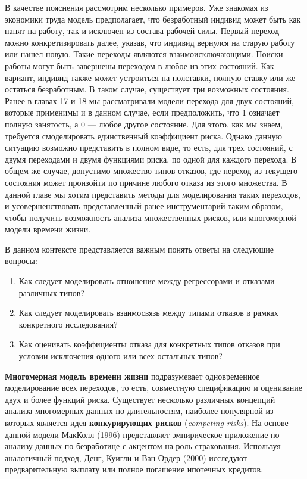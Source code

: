 В качестве пояснения рассмотрим несколько примеров. Уже знакомая из экономики труда модель предполагает, что безработный индивид может быть как нанят на работу, так и исключен из состава рабочей силы. Первый переход можно конкретизировать далее, указав, что индивид вернулся на старую работу или нашел новую. Такие переходы являются взаимоисключающими. Поиски работы могут быть завершены переходом в любое из этих состояний. Как вариант, индивид также может устроиться на полставки, полную ставку или же остаться безработным. В таком случае, существует три возможных состояния. Ранее в главах 17 и 18 мы рассматривали модели перехода для двух состояний, которые применимы и в данном случае, если предположить, что 1 означает полную занятость, а 0 --- любое другое состояние. Для этого, как мы знаем, требуется смоделировать единственный коэффициент риска. Однако данную ситуацию возможно представить в полном виде, то есть, для трех состояний, с двумя переходами и двумя функциями риска, по одной для каждого перехода. В общем же случае, допустимо множество типов отказов, где переход из текущего состояния может произойти по причине любого отказа из этого множества. В данной главе мы хотим представить методы для моделирования таких переходов, и усовершенствовать представленный ранее инструментарий таким образом, чтобы получить возможность анализа множественных рисков, или многомерной модели времени жизни.

В данном контексте представляется важным понять ответы на следующие вопросы:
\begin{enumerate}
\item Как следует моделировать отношение между регрессорами и отказами различных типов?
\item Как следует моделировать взаимосвязь между типами отказов в рамках конкретного исследования?
\item Как оценивать коэффициенты отказа для конкретных типов отказов при условии исключения одного или всех остальных типов?
\end{enumerate}

\textbf{Многомерная модель времени жизни} подразумевает одновременное моделирование всех переходов, то есть, совместную спецификацию и оценивание двух и более функций риска. Существует несколько различных концепций анализа многомерных данных по длительностям, наиболее популярной из которых является идея \textbf{конкурирующих рисков} (\textit{competing risks}). На основе данной модели МакКолл (1996) представляет эмпирическое приложение по анализу данных по безработице с акцентом на роль страхования. Используя аналогичный подход, Денг, Куигли и Ван Ордер (2000) исследуют предварительную выплату или полное погашение ипотечных кредитов.

